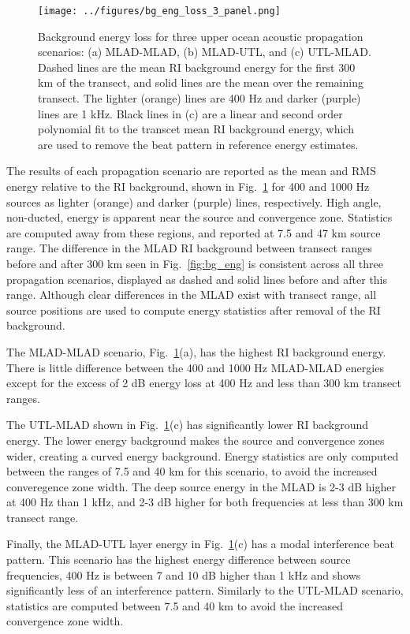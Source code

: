 \documentclass[preprint,NumberedRefs]{JASA}
\begin{document}
\begin{figure}
\texttt{[image: ../figures/bg\_eng\_loss\_3\_panel.png]}
        \caption{Background energy loss for three upper ocean acoustic propagation scenarios: (a) MLAD-MLAD, (b) MLAD-UTL, and (c) UTL-MLAD. Dashed lines are the mean RI background energy for the first 300 km of the transect, and solid lines are the mean over the remaining transect. The lighter (orange) lines are 400 Hz and darker (purple) lines are 1 kHz. Black lines in (c) are a linear and second order polynomial fit to the transcet mean RI background energy, which are used to remove the beat pattern in reference energy estimates.}
    \label{fig:eng_bg_3}
\end{figure}

The results of each propagation scenario are reported as the mean and RMS energy relative to the RI background, shown in Fig.~\ref{fig:eng_bg_3} for 400 and 1000 Hz sources as lighter (orange) and darker (purple) lines, respectively. High angle, non-ducted, energy is apparent near the source and convergence zone. Statistics are computed away from these regions, and reported at 7.5 and 47 km source range. The difference in the MLAD RI background between transect ranges before and after 300 km seen in Fig.~\ref{fig:bg_eng} is consistent across all three propagation scenarios, displayed as dashed and solid lines before and after this range. Although clear differences in the MLAD exist with transect range, all source positions are used to compute energy statistics after removal of the RI background.

The MLAD-MLAD scenario, Fig.~\ref{fig:eng_bg_3}(a), has the highest RI background energy. There is little difference between the 400 and 1000 Hz MLAD-MLAD energies except for the excess of 2 dB energy loss at 400 Hz and less than 300 km transect ranges.

The UTL-MLAD shown in Fig.~\ref{fig:eng_bg_3}(c) has significantly lower RI background energy. The lower energy background makes the source and convergence zones wider, creating a curved energy background. Energy statistics are only computed between the ranges of 7.5 and 40 km for this scenario, to avoid the increased converegence zone width. The deep source energy in the MLAD is 2-3 dB higher at 400 Hz than 1 kHz, and 2-3 dB higher for both frequencies at less than 300 km transect range.

Finally, the MLAD-UTL layer energy in Fig.~\ref{fig:eng_bg_3}(c) has a modal interference beat pattern. This scenario has the highest energy difference between source frequencies, 400 Hz is between 7 and 10 dB higher than 1 kHz and shows significantly less of an interference pattern. Similarly to the UTL-MLAD scenario, statistics are computed between 7.5 and 40 km to avoid the increased convergence zone width.
\end{document}
